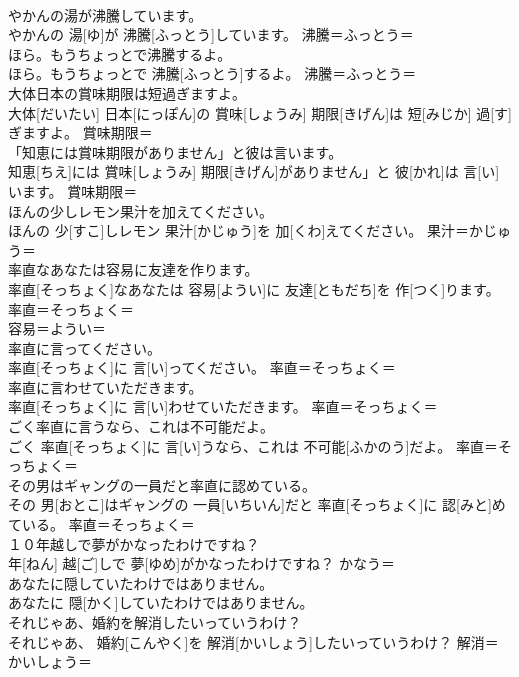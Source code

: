 \documentclass[8pt]{extreport}
\begin{document}
\begin{CJK}{UTF8}{min}
\\	やかんの湯が沸騰しています。	
\\	やかんの 湯[ゆ]が 沸騰[ふっとう]しています。	沸騰＝ふっとう＝ 
\\	ほら。もうちょっとで沸騰するよ。	
\\	ほら。もうちょっとで 沸騰[ふっとう]するよ。	沸騰＝ふっとう＝ 
\\	大体日本の賞味期限は短過ぎますよ。	
\\	大体[だいたい] 日本[にっぽん]の 賞味[しょうみ] 期限[きげん]は 短[みじか] 過[す]ぎますよ。	賞味期限＝ 
\\	「知恵には賞味期限がありません」と彼は言います。	
\\	知恵[ちえ]には 賞味[しょうみ] 期限[きげん]がありません」と 彼[かれ]は 言[い]います。	賞味期限＝ 
\\	ほんの少しレモン果汁を加えてください。	
\\	ほんの 少[すこ]しレモン 果汁[かじゅう]を 加[くわ]えてください。	果汁＝かじゅう＝ 
\\	率直なあなたは容易に友達を作ります。	
\\	率直[そっちょく]なあなたは 容易[ようい]に 友達[ともだち]を 作[つく]ります。	率直＝そっちょく＝ 
\\	容易＝ようい＝ 
\\	率直に言ってください。	
\\	率直[そっちょく]に 言[い]ってください。	率直＝そっちょく＝ 
\\	率直に言わせていただきます。	
\\	率直[そっちょく]に 言[い]わせていただきます。	率直＝そっちょく＝ 
\\	ごく率直に言うなら、これは不可能だよ。	
\\	ごく 率直[そっちょく]に 言[い]うなら、これは 不可能[ふかのう]だよ。	率直＝そっちょく＝ 
\\	その男はギャングの一員だと率直に認めている。	
\\	その 男[おとこ]はギャングの 一員[いちいん]だと 率直[そっちょく]に 認[みと]めている。	率直＝そっちょく＝ 
\\	１０年越しで夢がかなったわけですね？	
\\	年[ねん] 越[ご]しで 夢[ゆめ]がかなったわけですね？	かなう＝ 
\\	あなたに隠していたわけではありません。	
\\	あなたに 隠[かく]していたわけではありません。	
\\	それじゃあ、婚約を解消したいっていうわけ？	
\\	それじゃあ、 婚約[こんやく]を 解消[かいしょう]したいっていうわけ？	解消＝かいしょう＝ 

\end{CJK}
\end{document}
